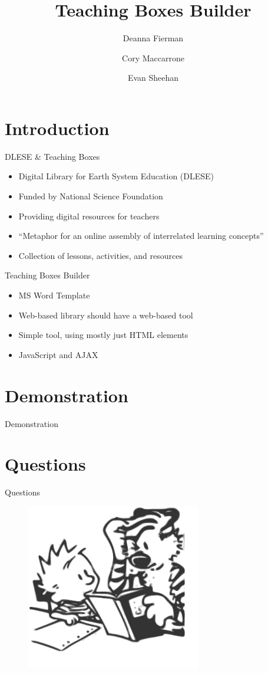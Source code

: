 \documentclass[style=horatio,mode=present,paper=screen]{powerdot}
\title{Teaching Boxes Builder}
\author{
	Deanna Fierman
	\and
	Cory Maccarrone
	\and
	Evan Sheehan
}
\begin{document}
\maketitle

\section[slide=false]{Introduction}
\begin{slide}{DLESE \& Teaching Boxes}
\begin{itemize}[type=1]
\item<1> Digital Library for Earth System Education (DLESE)
\pause
\item<2> Funded by National Science Foundation
\pause
\item<3> Providing digital resources for teachers
\pause
\item<4> ``Metaphor for an online assembly of interrelated learning concepts''
\pause
\item<5> Collection of lessons, activities, and resources
\end{itemize}
\end{slide}

\begin{slide}{Teaching Boxes Builder}
\begin{itemize}[type=1]
\item<1> MS Word Template
\pause
\item<2> Web-based library should have a web-based tool
\pause
\item<3> Simple tool, using mostly just HTML elements
\pause
\item<4> JavaScript and AJAX
\end{itemize}
\end{slide}

\section[slide=false]{Demonstration}
\begin{slide}[toc=,bm=]{Demonstration}
\end{slide}

\section[slide=false]{Questions}
\begin{slide}[toc=,bm=]{Questions}
\begin{figure}
\includegraphics[width=3in]{figures/calvin_and_hobbes}
\end{figure}
\end{slide}
\end{document}
